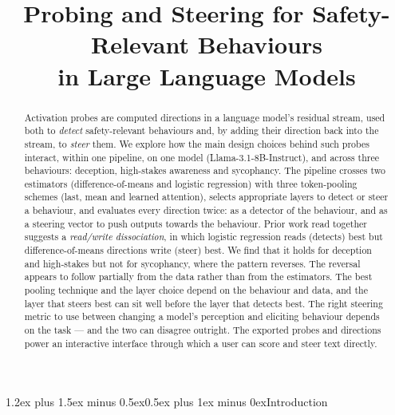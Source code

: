 \documentclass[conference]{IEEEtran}
\makeatletter
\renewcommand{\section}{\@startsection{section}{1}{\z@}%
  {1.2ex plus 1.5ex minus 0.5ex}{0.5ex plus 1ex minus 0ex}{\normalfont\normalsize\centering\scshape}}
\makeatother
\begin{document}
\title{\fontsize{23.5}{28.2}\selectfont Probing and Steering for Safety-Relevant Behaviours\\ in Large Language Models}

\author{
}

\maketitle

\begin{abstract}
Activation probes are computed directions in a language model's residual stream, used
both to \emph{detect} safety-relevant behaviours and, by adding their direction
back into the stream, to \emph{steer} them. We explore how the main design
choices behind such probes interact, within one pipeline, on one model
(Llama-3.1-8B-Instruct), and across three behaviours: deception, high-stakes
awareness and sycophancy. The pipeline crosses two estimators (difference-of-means
and logistic regression) with three token-pooling schemes (last, mean and learned
attention), selects appropriate layers to detect or steer a behaviour, and
evaluates every direction twice: as a detector of the behaviour, and as a steering vector 
to push outputs towards the behaviour. Prior work read together suggests a \emph{read/write
dissociation}, in which logistic regression reads (detects) best but difference-of-means
directions write (steer) best. We find that it holds for deception and high-stakes but
not for sycophancy, where the pattern reverses. The reversal appears to follow partially from the data rather than from the
estimators. The
best pooling technique and the layer choice depend on the behaviour and data, and the layer that
steers best can sit well before the layer that detects best. The right
steering metric to use between changing a model's perception and eliciting behaviour depends on the task — and the two can
disagree outright. The exported probes and
directions power an interactive interface through which a user can score and
steer text directly.
\end{abstract}

\section{Introduction}
\end{document}

